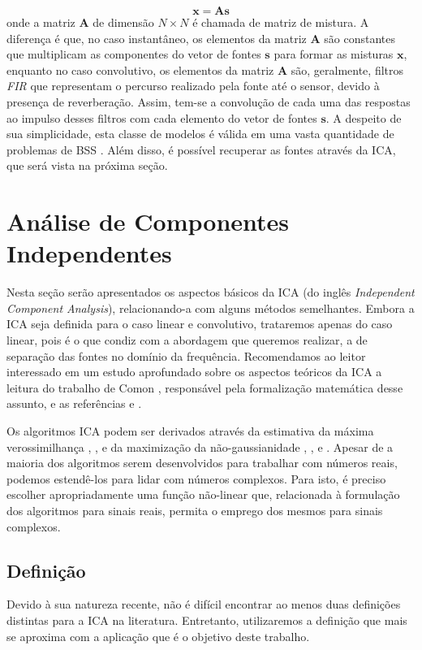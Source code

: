      \begin{equation}\label{eq:xn}
        \mathbf{x} = \mathbf{A}\mathbf{s}
    \end{equation}
    onde a matriz $\mathbf{A}$ de dimensão ${N \times N}$ é chamada de matriz de mistura. A diferença é que, no caso instantâneo, os elementos da matriz $\mathbf{A}$ são constantes que multiplicam as componentes do vetor de fontes $\mathbf{s}$ para formar as misturas $\mathbf{x}$, enquanto no caso convolutivo, os elementos da matriz $\mathbf{A}$ são, geralmente, filtros \textit{FIR} que representam o percurso realizado pela fonte até o sensor, devido à presença de reverberação. Assim, tem-se a convolução de cada uma das respostas ao impulso desses filtros com cada elemento do vetor de fontes $\mathbf{s}$. A despeito de sua simplicidade, esta classe de modelos é válida em uma vasta quantidade de problemas de BSS \cite{ICA}. Além disso, é possível recuperar as fontes através da ICA, que será vista na próxima seção.

\section{Análise de Componentes Independentes} \label{sec:ICA}
    Nesta seção serão apresentados os aspectos básicos da ICA (do inglês \textit{Independent Component Analysis}), relacionando-a com alguns métodos semelhantes. Embora a ICA seja definida para o caso linear e convolutivo, trataremos apenas do caso linear, pois é o que condiz com a abordagem que queremos realizar, a de separação das fontes no domínio da frequência. Recomendamos ao leitor interessado em um estudo aprofundado sobre os aspectos teóricos da ICA a leitura do trabalho de Comon \cite{Comon}, responsável pela formalização matemática desse assunto, e as referências \cite{ICA3} e \cite{ICA}.
    
    Os algoritmos ICA podem ser derivados através da estimativa da máxima verossimilhança \cite{ICAML}, \cite{ML}, \cite{NaturalICA} e da maximização da não-gaussianidade \cite{fastica1}, \cite{fastica2}, \cite{fastica3} e \cite{fasticaebm}. Apesar de a maioria dos algoritmos serem desenvolvidos para trabalhar com números reais, podemos estendê-los para lidar com números complexos. Para isto, é preciso escolher apropriadamente uma função não-linear que, relacionada à formulação dos algoritmos para sinais reais, permita o emprego dos mesmos para sinais complexos.

\subsection{Definição}
    Devido à sua natureza recente, não é difícil encontrar ao menos duas definições distintas para a ICA na literatura. Entretanto, utilizaremos a definição que mais se aproxima com a aplicação que é o objetivo deste trabalho.
    
